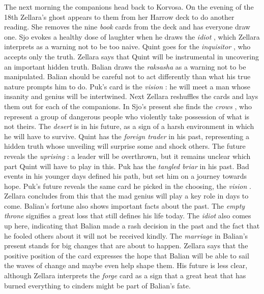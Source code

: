 The next morning the companions head back to Korvosa. On the evening of the 18th Zellara's ghost appears to them from her Harrow deck to do another reading. She removes the nine {\itshape book} cards from the deck and has everyone draw one. Sjo evokes a healthy dose of laughter when he draws the  {\itshape idiot} , which Zellara interprets as a warning not to be too naive. Quint goes for the  {\itshape inquisitor} , who accepts only the truth. Zellara says that Quint will be instrumental in uncovering an important hidden truth. Balian draws the  {\itshape raksasha} as a warning not to be manipulated. Balian should be careful not to act differently than what his true nature prompts him to do. Puk's card is the  {\itshape vision} : he will meet a man whose insanity and genius will be intertwined. Next Zellara reshuffles the cards and lays them out for each of the companions. In Sjo's present she finds the {\itshape crows} , who represent a group of dangerous people who violently take possession of what is not theirs. The  {\itshape desert} is in his future, as a sign of a harsh environment in which he will have to survive. Quint has the  {\itshape foreign trader} in his past, representing a hidden truth whose unveiling will surprise some and shock others. The future reveals the  {\itshape uprising} : a leader will be overthrown, but it remains unclear which part Quint will have to play in this. Puk has the  {\itshape tangled briar} in his past. Bad events in his younger days defined his path, but set him on a journey towards hope. Puk's future reveals the same card he picked in the choosing, the  {\itshape vision} . Zellara concludes from this that the mad genius will play a key role in days to come. Balian's fortune also shows important facts about the past. The  {\itshape empty throne} signifies a great loss that still defines his life today. The  {\itshape idiot} also comes up here, indicating that Balian made a rash decision in the past and the fact that he fooled others about it will not be received kindly. The  {\itshape marriage} in Balian's present stands for big changes that are about to happen. Zellara says that the positive position of the card expresses the hope that Balian will be able to sail the waves of change and maybe even help shape them. His future is less clear, although Zellara interprets the  {\itshape forge} card as a sign that a great heat that has burned everything to cinders might be part of Balian's fate. 